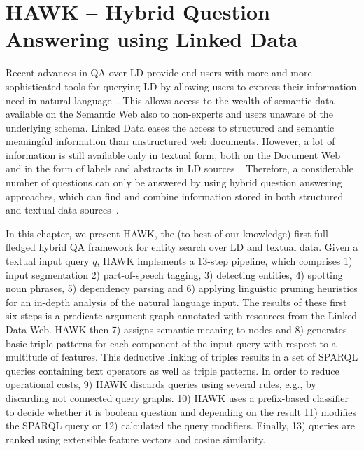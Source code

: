 \chapter{HAWK -- Hybrid Question Answering using Linked Data}
\label{cha:hawk}
Recent advances in \ac{QA} over \ac{LD} provide end users with more and more sophisticated tools for querying \ac{LD} by allowing users to express their information need in natural language~\cite{SINA_WebSemantic,pythia,template}. 
This allows access to the wealth of semantic data available on the Semantic Web also to non-experts and users unaware of the underlying schema. 
Linked Data eases the access to structured and semantic meaningful information than unstructured web documents.
However, a lot of information is still available only in textual form, both on the Document Web and in the form of labels and abstracts in \ac{LD} sources~\cite{GER+13}.
Therefore, a considerable number of questions can only be answered by using hybrid question answering approaches, which  can find and combine information stored in both structured and textual data sources~\cite{combiningLDandIR}.

In this chapter, we present HAWK, the (to best of our knowledge) first full-fledged hybrid \ac{QA} framework for entity search over \ac{LD} and textual data. 
Given a textual input query $q$, HAWK implements a 13-step pipeline, which comprises 1) input segmentation 2) part-of-speech tagging, 3) detecting entities, 4) spotting noun phrases, 5) dependency parsing and 6) applying linguistic pruning heuristics for an in-depth analysis of the natural language input. 
The results of these first six steps is a predicate-argument graph annotated with resources from the Linked Data Web. HAWK then 7) assigns semantic meaning to nodes and 8) generates basic triple patterns for each component of the input query with respect to a multitude of features. 
This deductive linking of triples results in a set of SPARQL queries containing text operators as well as triple patterns.
In order to reduce operational costs, 9) HAWK discards queries using several rules, e.g., by  discarding not connected query graphs.
10) HAWK uses a prefix-based classifier to decide whether it is boolean question and depending on the result 11) modifies the SPARQL query or 12) calculated the query modifiers.
Finally, 13) queries are ranked using extensible feature vectors and cosine similarity.

